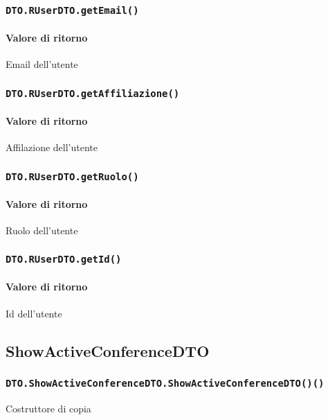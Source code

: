 \subsubsection{\texttt{DTO.RUserDTO.getEmail()}}
\paragraph{Valore di ritorno}
\begin{description}
\item Email dell'utente
\end{description}
\subsubsection{\texttt{DTO.RUserDTO.getAffiliazione()}}
\paragraph{Valore di ritorno}
\begin{description}
\item Affilazione dell'utente
\end{description}
\subsubsection{\texttt{DTO.RUserDTO.getRuolo()}}
\paragraph{Valore di ritorno}
\begin{description}
\item Ruolo dell'utente
\end{description}
\subsubsection{\texttt{DTO.RUserDTO.getId()}}
\paragraph{Valore di ritorno}
\begin{description}
\item Id dell'utente
\end{description}

\subsection{ShowActiveConferenceDTO}
\subsubsection{\texttt{DTO.ShowActiveConferenceDTO.ShowActiveConferenceDTO()()}}
Costruttore di copia

